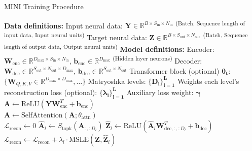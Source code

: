 \begin{algorithm}[h!]
\caption{MINI Training Procedure}
\label{algorithm:sdnn_model_training}
\begin{algorithmic}[1]
\State \textbf{Data definitions:}
\State \quad Input neural data: $\mathbf{Y} \in \mathbb{R}^{B \times S_{\text{in}} \times N_{\text{in}}}$ \textsuperscript{(Batch, Sequence length of input data, Input neural units)}
\State \quad Target neural data: $\mathbf{Z} \in \mathbb{R}^{B \times S_{\text{out}} \times N_{\text{out}}}$ \textsuperscript{(Batch, Sequence length of output data, Output neural units)}
\State \textbf{Model definitions:}
\State \quad Encoder: $\mathbf{W}_{\text{enc}} \in \mathbb{R}^{D_{\text{max}} \times S_{\text{in}} \times N_{\text{in}}}$, $\mathbf{b}_{\text{enc}} \in \mathbb{R}^{D_{\text{max}}}$ \textsuperscript{(Hidden layer neurons)}
\State \quad Decoder: $\mathbf{W}_{\text{dec}} \in \mathbb{R}^{S_{\text{out}} \times N_{\text{out}} \times D_{\text{max}}}$, $\mathbf{b}_{\text{dec}} \in \mathbb{R}^{S_{\text{out}} \times N_{\text{out}}}$
\State \quad Transformer block (optional) $\mathbf{\theta_{t}}$: $\{\mathbf{W}_{Q,K,V} \in \mathbb{R}^{D_{\max} \times D_{\max}}, \dots\}$
\State \quad Matryoshka levels: $\mathbf{\{D_l\}_{l=1}^L}$
\State \quad Weights each level's reconstruction loss (optional): $\mathbf{\{\lambda_l\}_{l=1}^L}$
\State \quad Auxiliary loss weight: $\mathbf{\gamma}$
\\
    \Statex {}
    \State $\mathbf{A} \gets \text{ReLU}(\mathbf{Y}\mathbf{W}_{\text{enc}}^T + \mathbf{b}_{\text{enc}})$ 
    \\
        \State $\mathbf{A} \gets \text{SelfAttention}(\mathbf{A}; \theta_{\text{attn}})$ 
    \EndIf
    \\
    \State $\mathcal{L}_{\text{recon}} \gets 0$
     
        \State $\hat{\mathbf{A}}_l \gets S_{\text{topk}}(\mathbf{A}_{:, :D_l})$ 
        \State $\hat{\mathbf{Z}}_l \gets \text{ReLU}(\hat{\mathbf{A}}_l \mathbf{W}_{\text{dec}, :, :D_l}^T + \mathbf{b}_{\text{dec}})$ 
        \State $\mathcal{L}_{\text{recon}} \gets \mathcal{L}_{\text{recon}} + \lambda_l \cdot \text{MSLE}(\mathbf{Z}, \hat{\mathbf{Z}}_l)$ 
    \EndFor
    

\end{algorithmic}
\end{algorithm}
